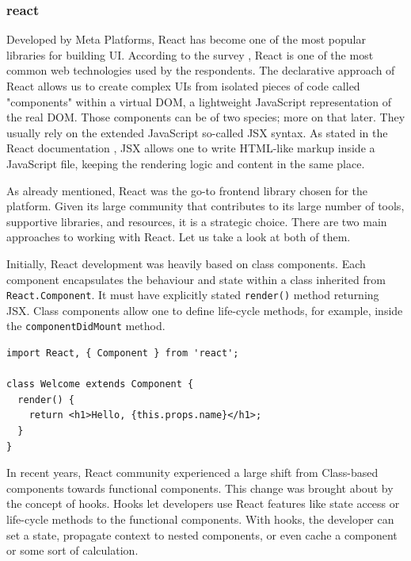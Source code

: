 \subsubsection{\gls{react}}
Developed by Meta Platforms, React has become one of the most popular libraries for building \ac{UI}.
According to the survey \cite{StackOverflow2023}, React is one of the most common web technologies used by the respondents.
The declarative approach of React allows us to create complex \ac{UI}s from isolated pieces of code called "components" \cite{react-docs} within a virtual \ac{DOM}, a lightweight JavaScript representation of the real \ac{DOM}.
Those components can be of two species; more on that later.
They usually rely on the extended JavaScript so-called JSX syntax.
As stated in the React documentation \cite{JSX-react-docs}, JSX allows one to write HTML-like markup inside a JavaScript file, keeping the rendering logic and content in the same place.

As already mentioned, React was the go-to frontend library chosen for the platform. 
Given its large community that contributes to its large number of tools, supportive libraries, and resources, it is a strategic choice.
There are two main approaches to working with React. Let us take a look at both of them.

\label{subsubsub:class-components}
Initially, React development was heavily based on class components.
Each component encapsulates the behaviour and state within a class inherited from \texttt{React.Component}.
It must have explicitly stated \texttt{render()} method returning JSX.
Class components allow one to define life-cycle methods, for example, inside the \texttt{componentDidMount} method.

\medskip
\begin{lstlisting}[caption=React class based component exmaple]
import React, { Component } from 'react';

class Welcome extends Component {
  render() {
    return <h1>Hello, {this.props.name}</h1>;
  }
}
\end{lstlisting}


\label{subsubsub:functional-components}
In recent years, React community experienced a large shift from Class-based components towards functional components.
This change was brought about by the concept of hooks. 
Hooks let developers use React features like state access or life-cycle methods to the functional components.
With hooks, the developer can set a state, propagate context to nested components, or even cache a component or some sort of calculation.

